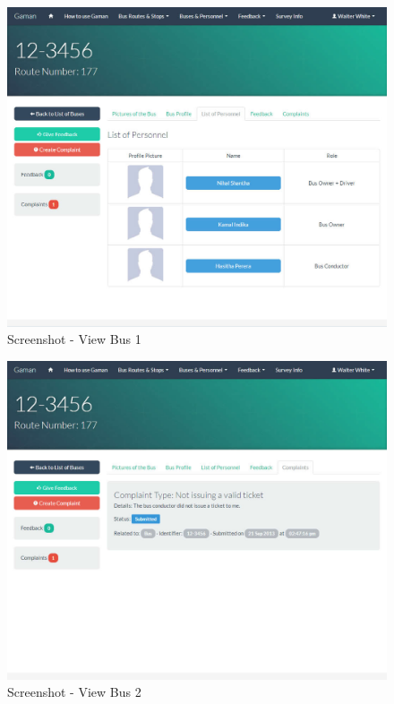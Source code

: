 \documentclass[12pt, oneside]{report}
\begin{document}
\begin {figure} [h!]
\centering
\includegraphics[scale=0.2]{viewBus1}
\caption [Screenshot - View Bus 1] {Screenshot - View Bus 1}
\label {image-viewBus1}
\end {figure}

\begin {figure} [h!]
\centering
\includegraphics[scale=0.2]{viewBus2}
\caption [Screenshot - View Bus 2] {Screenshot - View Bus 2}
\label {image-viewBus2}
\end {figure}
\end{document}

